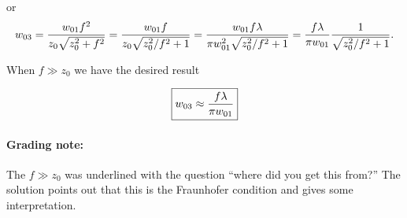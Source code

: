 {or
\begin{dmath}\label{eqn:problemSet4Problem1:280}
w_{03}
=
\frac{w_{01} f^2}{z_0 \sqrt{z_0^2 + f^2} }
=
\frac{w_{01} f}{z_0 \sqrt{z_0^2/f^2 + 1} }
=
\frac{w_{01} f \lambda}{\pi w_{01}^2 \sqrt{z_0^2/f^2 + 1} }
=
\frac{f \lambda}{\pi w_{01}} \inv{\sqrt{z_0^2/f^2 + 1} }.
\end{dmath}

When $f \gg z_0$ we have the desired result

\begin{dmath}\label{eqn:problemSet4Problem1:300}
\myBoxed{
w_{03}
\approx
\frac{f \lambda}{\pi w_{01}}
}
\end{dmath}

\paragraph{Grading note:} The $f \gg z_0$ was underlined with the question ``where did you get this from?''  The solution points out that this is the Fraunhofer condition and gives some interpretation.

}
